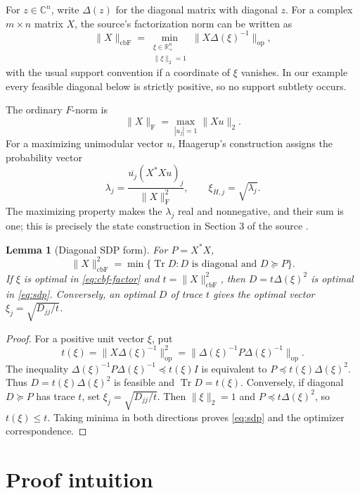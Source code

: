 \documentclass[11pt]{article}
\newtheorem{lemma}{Lemma}
\newcommand{\C}{\mathbb C}
\newcommand{\R}{\mathbb R}
\newcommand{\Tr}{\operatorname{Tr}}
\newcommand{\cbF}{\mathrm{cbF}}
\newcommand{\F}{\mathrm{F}}
\begin{document}
For $z\in\C^n$, write $\Delta(z)$ for the diagonal matrix with diagonal $z$.
For a complex $m\times n$ matrix $X$, the source's factorization norm can be
written as
\begin{equation}
 \|X\|_{\cbF}
 =\min_{\substack{\xi\in\R_+^n\\ \|\xi\|_2=1}}
   \bigl\|X\Delta(\xi)^{-1}\bigr\|_{\mathrm{op}},
 \label{eq:cbf-factor}
\end{equation}
with the usual support convention if a coordinate of $\xi$ vanishes.  In our
example every feasible diagonal below is strictly positive, so no support
subtlety occurs.

The ordinary $F$-norm is
\[
 \|X\|_{\F}=\max_{|u_j|=1}\|Xu\|_2.
\]
For a maximizing unimodular vector $u$, Haagerup's construction assigns the
probability vector
\begin{equation}
 \lambda_j=\frac{\overline{u_j}(X^*Xu)_j}{\|X\|_{\F}^2},
 \qquad \xi_{H,j}=\sqrt{\lambda_j}.
 \label{eq:haagerup}
\end{equation}
The maximizing property makes the $\lambda_j$ real and nonnegative, and their
sum is one; this is precisely the state construction in Section 3 of the
source \cite{Christensen2024}.

\begin{lemma}[Diagonal SDP form]
For $P=X^*X$,
\begin{equation}
 \|X\|_{\cbF}^2
 =\min\{\Tr D: D\text{ is diagonal and }D\succeq P\}.
 \label{eq:sdp}
\end{equation}
If $\xi$ is optimal in \eqref{eq:cbf-factor} and
$t=\|X\|_{\cbF}^2$, then $D=t\Delta(\xi)^2$ is optimal in
\eqref{eq:sdp}.  Conversely, an optimal $D$ of trace $t$ gives the optimal
vector $\xi_j=\sqrt{D_{jj}/t}$.
\end{lemma}

\begin{proof}
For a positive unit vector $\xi$, put
\[
 t(\xi)=\|X\Delta(\xi)^{-1}\|_{\mathrm{op}}^2
 =\|\Delta(\xi)^{-1}P\Delta(\xi)^{-1}\|_{\mathrm{op}}.
\]
The inequality
$\Delta(\xi)^{-1}P\Delta(\xi)^{-1}\preceq t(\xi)I$
is equivalent to
$P\preceq t(\xi)\Delta(\xi)^2$.  Thus
$D=t(\xi)\Delta(\xi)^2$ is feasible and
$\Tr D=t(\xi)$.  Conversely, if diagonal $D\succeq P$ has trace $t$, set
$\xi_j=\sqrt{D_{jj}/t}$.  Then $\|\xi\|_2=1$ and
$P\preceq t\Delta(\xi)^2$, so $t(\xi)\le t$.  Taking minima in both
directions proves \eqref{eq:sdp} and the optimizer correspondence.
\end{proof}

\section{Proof intuition}
\end{document}
